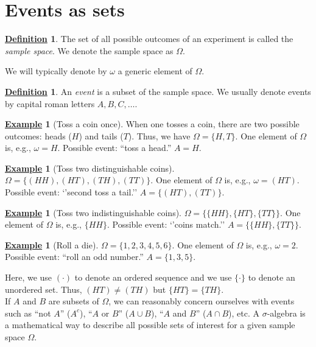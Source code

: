 \documentclass[12pt]{book}
\numberwithin{equation}{chapter}
\theoremstyle{plain}
\numberwithin{theorem}{section}
\theoremstyle{definition}
\newtheorem{definition}[theorem]{\underline{Definition}}
\newtheorem{example}[theorem]{\underline{Example}}
\numberwithin{exercise}{chapter}
\newcommand{\<}{\langle}
\renewcommand{\>}{\rangle}
\renewcommand{\(}{\left(}
\renewcommand{\)}{\right)}
\renewcommand{\[}{\left[}
\renewcommand{\]}{\right]}
\newcommand\om{\omega}
\newcommand\Om{\Omega}
\newcommand\sig{\sigma}
\begin{document}

\section{Events as sets}
\begin{definition}
The set of all possible outcomes of an experiment is called the \emph{sample space}.  We denote the sample space as $\Om$.
\end{definition}

\noindent
We will typically denote by $\om$ a generic element of $\Om$.

\begin{definition}
An \emph{event} is a subset of the sample space.  We usually denote events by capital roman letters $A, B, C, \ldots$.
\end{definition}

\begin{example}[Toss a coin once]
When one tosses a coin, there are two possible outcomes: heads ($H$) and tails ($T$).  Thus, we have
$\Om = \{ H, T \}$.  One element of $\Om$ is, e.g., $\om = H$.  Possible event: ``toss a head.''  $A = H$.
\end{example}

\begin{example}[Toss two distinguishable coins]
$\Om = \{ (HH), (HT), (TH), (TT) \}$.  One element of $\Om$ is, e.g.,  $\om = (HT)$.  Possible event: `'second toss a tail.'' $A = \{ (HT), (TT) \}$. 
\end{example}

\begin{example}[Toss two indistinguishable coins]
$\Om = \{ \{HH\}, \{HT\}, \{TT\} \}$.  One element of $\Om$ is, e.g.,  $\{HH\}$. Possible event: `'coins match.'' $A = \{ \{HH\},\{TT\} \}$.
\end{example}

\begin{example}[Roll a die]
$\Om = \{ 1, 2, 3, 4, 5, 6 \}$.  One element of $\Om$ is, e.g.,  $\om = 2$.  Possible event: ``roll an odd number.'' $A = \{ 1, 3, 5 \}$.
\end{example}

\noindent
Here, we use $( \cdot )$ to denote an ordered sequence and we use $\{ \cdot \}$ to denote an unordered set.  Thus, $(HT) \neq (TH)$ but $\{HT\}=\{TH\}$.
\\[0.5em]
If $A$ and $B$ are subsets of $\Om$, we can reasonably concern ourselves with events such as ``not $A$'' ($A^c$), ``$A$ or $B$'' ($A \cup B$), ``$A$ and $B$'' ($A \cap B$), etc.  A $\sig$-algebra is a mathematical way to describe all possible sets of interest for a given sample space $\Om$.
\end{document}
